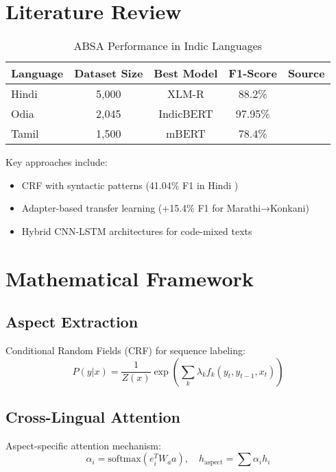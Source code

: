 \documentclass[12pt,a4paper]{article}
\begin{document}
\section{Literature Review}
\label{sec:litreview}

\begin{table}[ht]
    \centering
    \caption{ABSA Performance in Indic Languages}
    \label{tab:performance}
    \begin{tabular}{@{}lcccr@{}}
        \toprule
        Language & Dataset Size & Best Model & F1-Score & Source \\
        \midrule
        Hindi & 5,000 & XLM-R & 88.2\% & \cite{hindi_absa} \\
        Odia & 2,045 & IndicBERT & 97.95\% & \cite{odia_benchmark} \\
        Tamil & 1,500 & mBERT & 78.4\% & \cite{tamil_absa} \\
        \bottomrule
    \end{tabular}
\end{table}

Key approaches include:
\begin{itemize}
    \item CRF with syntactic patterns (41.04\% F1 in Hindi \cite{hindi_crf})
    \item Adapter-based transfer learning (+15.4\% F1 for Marathi→Konkani)
    \item Hybrid CNN-LSTM architectures for code-mixed texts
\end{itemize}

\section{Mathematical Framework}
\label{sec:math}

\subsection{Aspect Extraction}
Conditional Random Fields (CRF) for sequence labeling:
\begin{equation}
    P(y|x) = \frac{1}{Z(x)} \exp\left(\sum_{k} \lambda_k f_k(y_t, y_{t-1}, x_t)\right)
\end{equation}

\subsection{Cross-Lingual Attention}
Aspect-specific attention mechanism:
\begin{equation}
    \alpha_i = \text{softmax}(e_i^T W_a a),\quad h_{\text{aspect}} = \sum \alpha_i h_i
\end{equation}
\end{document}
